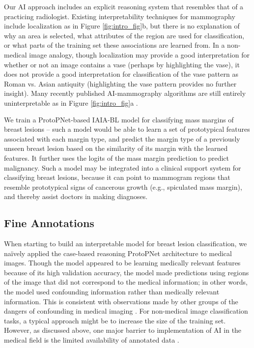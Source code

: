 \documentclass[11pt]{article}
\begin{document}
Our AI approach includes an explicit reasoning system that resembles that of a practicing radiologist. Existing interpretability techniques for mammography include localization as in Figure \ref{fig:intro_fig}b, but there is no explanation of why an area is selected, what attributes of the region are used for classification, or what parts of the training set these associations are learned from. In a non-medical image analogy, though localization may provide a good interpretation for whether or not an image contains a vase (perhaps by highlighting the vase), it does not provide a good interpretation for classification of the vase pattern as Roman vs$.$ Asian antiquity (highlighting the vase pattern provides no further insight). Many recently published AI-mammography algorithms are still entirely uninterpretable as in Figure \ref{fig:intro_fig}a \citep{mckinney2020international}. 

We train a ProtoPNet-based IAIA-BL model for classifying mass margins of breast lesions -- such a model would be able to learn a set of prototypical features associated with each margin type, and predict the margin type of a previously unseen breast lesion based on the similarity of its margin with the learned features. It further uses the logits of the mass margin prediction to predict malignancy. Such a model may be integrated into a clinical support system for classifying breast lesions, because it can point to mammogram regions that resemble prototypical signs of cancerous growth (e.g., spiculated mass margin), and thereby assist doctors in making diagnoses. 

\subsection{Fine Annotations}

When starting to build an interpretable model for breast lesion classification, we na\"ively applied the case-based reasoning ProtoPNet architecture to medical images. Though the model appeared to be learning medically relevant features because of its high validation accuracy, the model made predictions using regions of the image that did not correspond to the medical information; in other words, the model used confounding information rather than medically relevant information. This is consistent with observations made by other groups of the dangers of confounding in medical imaging \citep{wang2019removing}. For non-medical image classification tasks, a typical approach might be to increase the size of the training set. However, as discussed above, one major barrier to implementation of AI in the medical field is the limited availability of annotated data \citep{soffer2019convolutional}. 
\end{document}
